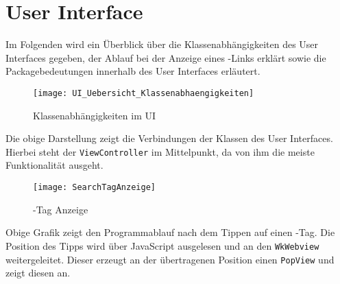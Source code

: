
\chapter{User Interface}

Im Folgenden wird ein Überblick über die Klassenabhängigkeiten des User Interfaces gegeben, der Ablauf bei der Anzeige eines \SEARCH-Links erklärt sowie die Packagebedeutungen innerhalb des User Interfaces erläutert.

\begin{figure}[h]
	\centering
	\texttt{[image: UI\_Uebersicht\_Klassenabhaengigkeiten]}
	\caption{Klassenabhängigkeiten im UI}
\end{figure}

Die obige Darstellung zeigt die Verbindungen der Klassen des User Interfaces. Hierbei steht der \lstinline|ViewController| im Mittelpunkt, da von ihm die meiste Funktionalität ausgeht.

\begin{figure}[ht]
	\centering
	\texttt{[image: SearchTagAnzeige]}
	\caption{\SEARCH-Tag Anzeige}
\end{figure}

Obige Grafik zeigt den Programmablauf nach dem Tippen auf einen \SEARCH-Tag. Die Position des Tipps wird über JavaScript ausgelesen und an den \lstinline|WkWebview| weitergeleitet. Dieser erzeugt an der übertragenen Position einen \lstinline|PopView| und zeigt diesen an. 


\newpage

\newpage

\newpage

\newpage

\newpage


